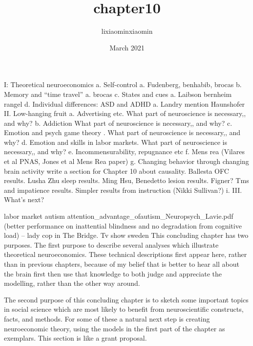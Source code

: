 \documentclass{article}
\title{chapter10}
\author{lixiaominxiaomin }
\date{March 2021}
\begin{document}
\maketitle
I:  Theoretical neuroeconomics 
a.	Self-control
a.	Fudenberg, benhabib, brocas
b.	Memory and “time travel”
a.	brocas
c.	States and cues
a.	Laibson bernheim rangel 
d.	Individual differences: ASD and ADHD
a.	Landry  mention Haunshofer
II. Low-hanging fruit 
a.	Advertising etc. What part of neuroscience is necessary,, and why? 
b.	Addiction What part of neuroscience is necessary,, and why? 
c.	Emotion and psych game theory . What part of neuroscience is necessary,, and why? 
d.	Emotion and skills in labor markets. What part of neuroscience is necessary,, and why? 
e.	Incommensurability, repugnance etc 
f.	Mens rea (Vilares et al PNAS, Jones et al Mens Rea paper)
g.	Changing behavior through changing brain activity  write a  section for Chapter 10 about causality. Ballesta OFC results.  Lusha Zhu sleep results.  Ming Hsu, Benedetto lesion results.  Figner? Tms and impatience results.  Simpler results from instruction (Nikki Sullivan?) 
i.	
III. What’s next? 


labor market autism  attention\_advantage\_ofautism\_Neuropsych\_Lavie.pdf   (better performance on inattential blindness and no degradation from cognitive load) – lady cop in The Bridge. Tv show sweden
	This concluding chapter has two purposes. The first purpose to describe several analyses which illustrate theoretical neuroeconomics. These technical descriptions first appear here, rather than in previous chapters, because of my belief that is better to hear all about the brain first then use that knowledge to both judge and appreciate the modelling, rather than the other way around.  

	The second purpose of this concluding chapter is to sketch some important topics in social science which are most likely to benefit from neuroscientific constructs, facts, and methods. For some of these a natural next step is creating neuroeconomic theory, using the models in the first part of the chapter as exemplars. This section is like  a grant proposal.  
\end{document}
